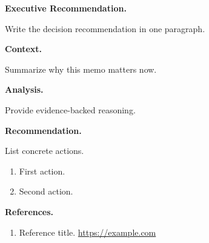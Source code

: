 \documentclass[11pt]{article}
\begin{document}
\MemoRenderHeader

\textbf{Executive Recommendation.}

Write the decision recommendation in one paragraph.

\textbf{Context.}

Summarize why this memo matters now.

\textbf{Analysis.}

Provide evidence-backed reasoning.

\textbf{Recommendation.}

List concrete actions.
\begin{enumerate}
  \item First action.
  \item Second action.
\end{enumerate}

\textbf{References.}
\begin{enumerate}
  \item Reference title. \url{https://example.com}
\end{enumerate}
\end{document}
